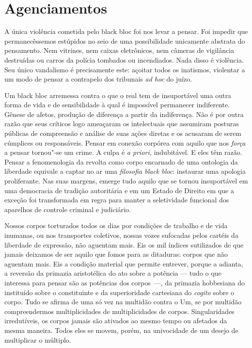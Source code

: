 
\section{Agenciamentos}

A única violência cometida pelo black bloc foi
nos levar a pensar. Foi impedir que permanecêssemos estúpidos no seio de
uma possibilidade unicamente abstrata do pensamento. Nem vitrines, nem
caixas eletrônicos, nem câmeras de vigilância destruídas ou carros da
polícia tombados ou incendiados. Nada disso é violência. Seu único
vandalismo é precisamente este: açoitar todos os inatismos, violentar a
um modo de pensar a contrapelo dos tribunais \emph{ad hoc} do juízo.

Um black bloc arremessa contra o que o real tem de insuportável uma
outra forma de vida e de sensibilidade à qual é impossível permanecer
indiferente. Gênese de afetos, produção de diferença a partir da
indiferença. Não é por outra razão que seus críticos logo ameaçaram os
intelectuais que assumiram posturas públicas de compreensão e análise de
suas ações diretas e os acusaram de serem cúmplices ou responsáveis.
Pensar em conexão corpórea com aquilo que nos \emph{força }a pensar
tornou"-se um crime. A culpa é \emph{a priori, }indubitável. E eles têm
razão. Pensar a fenomenologia da revolta como corpo encarnado de uma
ontologia da liberdade equivale a captar no ar uma \emph{filosofia black
bloc}: instaurar uma apologia proliferante. Nas suas margens, emerge
tudo aquilo que se tornou insuportável em uma democracia de tradição
autoritária e em um Estado de Direito em que a exceção foi transformada
em regra para manter a seletividade funcional dos aparelhos de controle
criminal e judiciário.

Nossos corpos torturados todos os dias por condições de trabalho e de
vida inumanas, ou nos transportes coletivos, nossas vozes sufocadas
pelos cartéis da liberdade de expressão, não aguentam mais. Eis os mil
índices sutilizados de que jamais deixamos de ser aquilo que fomos para
as ditaduras: corpos que não aguentam mais. Eis a condição material que
permite entrever, porque a adianta, a reversão da primazia aristotélica
do ato sobre a potência --- tudo o que interessa para pensar são as
potências dos corpos~---, da primazia hobbesiana do instituído sobre o
constituinte e da superioridade cartesiana do \emph{cogito }sobre o
corpo. Tudo se afirma de uma só vez na multidão contra o Um, se por
multidão compreendermos multiplicidades de multiplicidades de corpos.
Singularidades irredutíveis, os corpos jamais são ativados ao mesmo
tempo ou afetados da mesma maneira. Todos eles se movem, porém, na
univocidade de um desejo de multiplicar o múltiplo.

